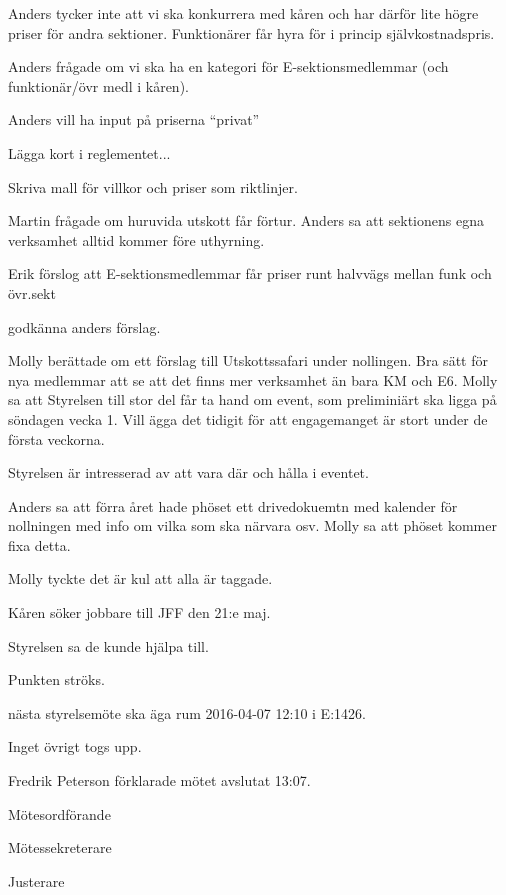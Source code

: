 \documentclass[10pt]{article}
\def\mo{Fredrik Peterson}
\def\ms{Erik Månsson}
\def\ji{Martin Gemborn Nilsson}
\begin{document}
\begin{paragrafer}
Anders tycker inte att vi ska konkurrera med kåren och har därför lite högre priser för andra sektioner. Funktionärer får hyra för i princip självkostnadspris.

Anders frågade om vi ska ha en kategori för E-sektionsmedlemmar (och funktionär/övr medl i kåren).

Anders vill ha input på priserna ``privat''

Lägga kort i reglementet... %

Skriva mall för villkor och priser som riktlinjer. %

Martin frågade om huruvida utskott får förtur. Anders sa att sektionens egna verksamhet alltid kommer före uthyrning.

Erik förslog att E-sektionsmedlemmar får priser runt halvvägs mellan funk och övr.sekt

\Mba godkänna anders förslag.

Molly berättade om ett förslag till Utskottssafari under nollingen. Bra sätt för nya medlemmar att se att det finns mer verksamhet än bara KM och E6. Molly sa att Styrelsen till stor del får ta hand om event, som preliminiärt ska ligga på söndagen vecka 1. Vill ägga det tidigit för att engagemanget är stort under de första veckorna.

Styrelsen är intresserad av att vara där och hålla i eventet.

Anders sa att förra året hade phöset ett drivedokuemtn med kalender för nollningen med info om vilka som ska närvara osv. Molly sa att phöset kommer fixa detta.

Molly tyckte det är kul att alla är taggade.

Kåren söker jobbare till JFF den 21:e maj.

Styrelsen sa de kunde hjälpa till.

Punkten ströks.

\Mba nästa styrelsemöte ska äga rum 2016-04-07 12:10 i E:1426.

\Ibfu

Inget övrigt togs upp.

{\mo} förklarade mötet avslutat 13:07.

\end{paragrafer}

\hidesignfoot
\begin{signatures}{3}
\signature{\mo}{Mötesordförande}
\signature{\ms}{Mötessekreterare}
\signature{\ji}{Justerare}
\end{signatures}
\end{document}
